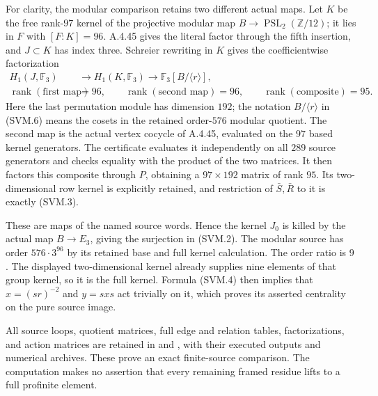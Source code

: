 For clarity, the modular comparison retains two different actual maps.
Let $K$ be the free rank-$97$ kernel of the projective modular map
$B\to\operatorname{PSL}_2(\mathbb Z/12)$; it lies in $F$ with
$[F:K]=96$.  A.4.45 gives the literal factor through the fifth
insertion, and $J\subset K$ has index three.  Schreier rewriting in
$K$ gives the coefficientwise factorization
\[
 \begin{split}
 H_1(J,\mathbb F_3)&\longrightarrow H_1(K,\mathbb F_3)
                 \longrightarrow \mathbb F_3[B/\langle r\rangle],\\
 \operatorname{rank}(\text{first map})&=96,\qquad
 \operatorname{rank}(\text{second map})=96,\qquad
 \operatorname{rank}(\text{composite})=95.
 \end{split}
                                                               \tag{SVM.6}
\]
Here the last permutation module has dimension $192$; the notation
$B/\langle r\rangle$ in (SVM.6) means the cosets in the retained
order-$576$ modular quotient.  The second map is the actual vertex
cocycle of A.4.45, evaluated on the $97$ based kernel generators.
The certificate evaluates it independently on all $289$ source
generators and checks equality with the product of the two matrices.
It then factors this composite through $P$, obtaining a
$97\times192$ matrix of rank $95$.  Its two-dimensional row kernel
is explicitly retained, and restriction of $\bar S,\bar R$ to it is
exactly (SVM.3).

These are maps of the named source words.  Hence the kernel $J_0$
is killed by the actual map $B\to E_3$, giving the surjection in
(SVM.2).  The modular source has order $576\cdot3^{96}$ by its
retained base and full kernel calculation.  The order ratio is $9$.
The displayed two-dimensional kernel already supplies nine elements
of that group kernel, so it is the full kernel.  Formula (SVM.4)
then implies that $x=(sr)^{-2}$ and $y=sxs$ act trivially on it,
which proves its asserted centrality on the pure source image.

All source loops, quotient matrices, full edge and relation tables,
factorizations, and action matrices are retained in
 and
, with their
executed outputs and numerical archives.  These prove an exact
finite-source comparison.  The computation makes no assertion that
every remaining framed residue lifts to a full profinite element.
